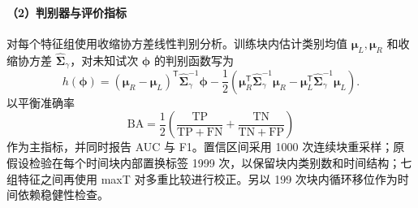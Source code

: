 \documentclass[a4paper,zihao=-4,linespread=1]{ctexart}
\numberwithin{figure}{section}       %
\begin{document}
\begin{table}[H]
\centering
\caption{视觉刺激响应特征构成表}
\label{tab:q2_feature_def}
\end{table}

\paragraph{（2）判别器与评价指标}

对每个特征组使用收缩协方差线性判别分析。训练块内估计类别均值 $\boldsymbol\mu_L,\boldsymbol\mu_R$ 和收缩协方差 $\widehat{\boldsymbol\Sigma}_\gamma$，对未知试次 $\boldsymbol\phi$ 的判别函数写为
\begin{equation}
h(\boldsymbol\phi)
=
\left(\boldsymbol\mu_R-\boldsymbol\mu_L\right)^{\mathsf T}
\widehat{\boldsymbol\Sigma}_{\gamma}^{-1}\boldsymbol\phi
-\frac12
\left(
\boldsymbol\mu_R^{\mathsf T}
\widehat{\boldsymbol\Sigma}_{\gamma}^{-1}\boldsymbol\mu_R
-
\boldsymbol\mu_L^{\mathsf T}
\widehat{\boldsymbol\Sigma}_{\gamma}^{-1}\boldsymbol\mu_L
\right).
\label{eq:q2_lda}
\end{equation}
以平衡准确率
\begin{equation}
\mathrm{BA}
=\frac12
\left(
\frac{\mathrm{TP}}{\mathrm{TP}+\mathrm{FN}}
+
\frac{\mathrm{TN}}{\mathrm{TN}+\mathrm{FP}}
\right)
\label{eq:q2_ba}
\end{equation}
作为主指标，并同时报告 AUC 与 F1。置信区间采用 1000 次连续块重采样；原假设检验在每个时间块内部置换标签 1999 次，以保留块内类别数和时间结构；七组特征之间再使用 maxT 对多重比较进行校正。另以 199 次块内循环移位作为时间依赖稳健性检查。
\end{document}
